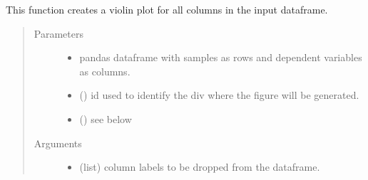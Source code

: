 \documentclass[letterpaper,10pt,english]{sphinxmanual}
\begin{document}

\begin{fulllineitems}
\label{\detokenize{_autosummary/analytics_core.viz:analytics_core.viz.viz.get_multi_table}}
\end{fulllineitems}


\begin{fulllineitems}
\label{\detokenize{_autosummary/analytics_core.viz:analytics_core.viz.viz.get_violinplot}}
This function creates a violin plot for all columns in the input dataframe.
\begin{quote}\begin{description}
\item[{Parameters}] \leavevmode\begin{itemize}
\item {} 
 \textendash{} pandas dataframe with samples as rows and dependent variables as columns.

\item {} 
 () \textendash{} id used to identify the div where the figure will be generated.

\item {} 
 () \textendash{} see below

\end{itemize}

\item[{Arguments}] \leavevmode\begin{itemize}
\item {} 
 (list) \textendash{} column labels to be dropped from the dataframe.


\end{itemize}
\end{description}
\end{quote}
\end{fulllineitems}
\end{document}
